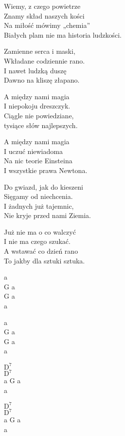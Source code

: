 \begin{text}
    Wiemy, z czego powietrze\\
    Znamy skład naszych kości\\
    Na miłość mówimy „chemia”\\
    Białych plam nie ma historia ludzkości.

    Zamienne serca i maski,\\
    Wkładane codziennie rano.\\
    I nawet ludzką duszę\\
    Dawno na kliszę złapano.

    \vin A między nami magia\\
    \vin I niepokoju dreszczyk.\\
    \vin Ciągle nie powiedziane,\\
    \vin tysiące słów najlepszych.

    \vin A między nami magia\\
    \vin I uczuć niewiadoma\\
    \vin Na nic teorie Einsteina\\
    \vin I wszystkie prawa Newtona.

    Do gwiazd, jak do kieszeni\\
    Sięgamy od niechcenia.\\
    I żadnych już tajemnic,\\
    Nie kryje przed nami Ziemia.

    Już nie ma o co walczyć\\
    I nie ma czego szukać.\\
    A wstawać co dzień rano\\
    To jakby dla sztuki sztuka.
\end{text}
\begin{chord}
    a\\
    G a\\
    G a\\
    a

    a\\
    G a\\
    G a\\
    a

    $\mathrm{D^{7}}$\\
    $\mathrm{D^{7}}$\\
    a G a\\
    a

    $\mathrm{D^{7}}$\\
    $\mathrm{D^{7}}$\\
    a G a\\
    a
\end{chord}
